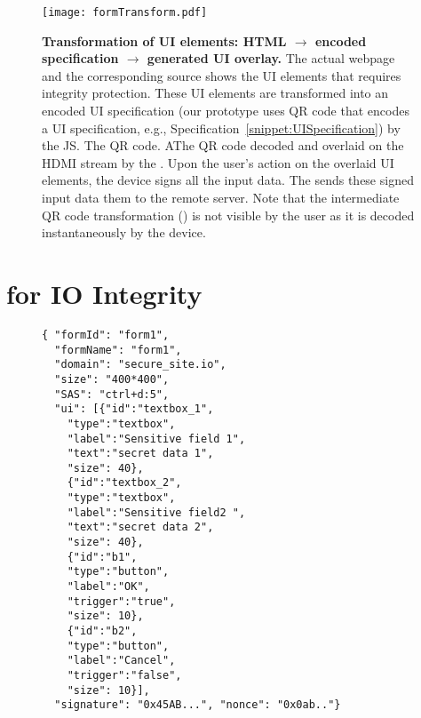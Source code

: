 \begin{figure*}[t]
\centering
\texttt{[image: formTransform.pdf]}
\caption{\textbf{Transformation of UI elements: HTML $\rightarrow$ encoded specification $\rightarrow$ \device generated UI overlay.} \one The actual webpage and the corresponding \html source shows the UI elements that requires integrity protection. \two These UI elements are transformed into an encoded UI specification (our \name prototype uses QR code that encodes a UI specification, e.g., Specification~\ref{snippet:UISpecification}) by the \name JS. The QR code. \three AThe QR code decoded and overlaid on the HDMI stream by the \device. \four Upon the user's action on the overlaid UI elements, the device signs all the input data. \five The \device sends these signed input data them to the remote server. Note that the intermediate QR code transformation (\two) is not visible by the user as it is decoded instantaneously by the device.}
\spacesave
\label{fig:transformation}
\end{figure*}

\section{\name for IO Integrity}
\label{sec:systemDesign}




\begin{figure}[t]
\begin{lstlisting}[mathescape=true]
{ "formId": "form1",
  "formName": "form1",
  "domain": "secure_site.io",
  "size": "400*400",
  "SAS": "ctrl+d:5",
  "ui": [{"id":"textbox_1",
  	"type":"textbox",
	"label":"Sensitive field 1",
	"text":"secret data 1",
	"size": 40},
	{"id":"textbox_2",
	"type":"textbox",
	"label":"Sensitive field2 ",
	"text":"secret data 2",
	"size": 40},
	{"id":"b1",
	"type":"button",
	"label":"OK",
	"trigger":"true",
	"size": 10},	
	{"id":"b2",
	"type":"button",
	"label":"Cancel",
	"trigger":"false",
	"size": 10}],
  "signature": "0x45AB...", "nonce": "0x0ab.."}
\end{lstlisting}
\end{figure}

